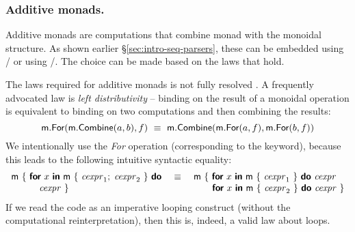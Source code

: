 \documentclass[runningheads,a4paper]{llncs}
\begin{document}
\subsubsection{Additive monads.} Additive monads are computations that combine monad with 
the monoidal structure. As shown earlier \S\ref{sec:intro-seq-parsers}, these can be embedded
using / or using /. The choice can be made
based on the laws that hold.

The laws required for additive monads is not fully resolved \cite{monadplus}. A frequently advocated
law is \emph{left distributivity} -- binding on the result of a monoidal operation is equivalent 
to binding on two computations and then combining the results:
%
\begin{equation*}
\textnormal{\sffamily m}.\textnormal{\sffamily For}(\textnormal{\sffamily m}.\textnormal{\sffamily Combine}(a, b), f)
~\equiv~
\textnormal{\sffamily m}.\textnormal{\sffamily Combine}(\textnormal{\sffamily m}.\textnormal{\sffamily For}(a, f), \textnormal{\sffamily m}.\textnormal{\sffamily For}(b, f))
\end{equation*}
%
We intentionally use the \emph{For} operation (corresponding to the  keyword), because
this leads to the following intuitive syntactic equality:
%
\begin{equation*}
\begin{array}{l}
\textnormal{\sffamily m}~\{~  \textnormal{\bfseries\sffamily for}~x~\textnormal{\bfseries\sffamily in}~\textnormal{\sffamily m}~\{~\textnormal{\emph{cexpr}}_1;\;\textnormal{\emph{cexpr}}_2~\}~\textnormal{\bfseries\sffamily do}\\
\hspace{2.0em}\quad \textnormal{\emph{cexpr}}~\}
\end{array}~
\begin{array}{c}\equiv\\~\end{array}~
\begin{array}{l}
\textnormal{\sffamily m}~\{~ \textnormal{\bfseries\sffamily for}~x~\textnormal{\bfseries\sffamily in}~\textnormal{\sffamily m}~\{~\textnormal{\emph{cexpr}}_1~\}~\textnormal{\bfseries\sffamily do}~\textnormal{\emph{cexpr}} \\
\hspace{2em}  \textnormal{\bfseries\sffamily for}~x~\textnormal{\bfseries\sffamily in}~\textnormal{\sffamily m}~\{~\textnormal{\emph{cexpr}}_2~\}~\textnormal{\bfseries\sffamily do}~\textnormal{\emph{cexpr}}~\}
\end{array}
\end{equation*}
%
If we read the code as an imperative looping construct (without the computational reinterpretation),
then this is, indeed, a valid law about  loops.
\end{document}
